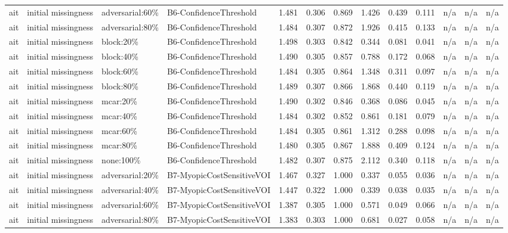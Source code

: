 \begin{table}[!ht]
{\begin{tabular}{lllllllllllll}
ait & initial missingness & adversarial:60\% & B6-ConfidenceThreshold & 1.481 & 0.306 & 0.869 & 1.426 & 0.439 & 0.111 & n/a & n/a & n/a \\
ait & initial missingness & adversarial:80\% & B6-ConfidenceThreshold & 1.484 & 0.307 & 0.872 & 1.926 & 0.415 & 0.133 & n/a & n/a & n/a \\
ait & initial missingness & block:20\% & B6-ConfidenceThreshold & 1.498 & 0.303 & 0.842 & 0.344 & 0.081 & 0.041 & n/a & n/a & n/a \\
ait & initial missingness & block:40\% & B6-ConfidenceThreshold & 1.490 & 0.305 & 0.857 & 0.788 & 0.172 & 0.068 & n/a & n/a & n/a \\
ait & initial missingness & block:60\% & B6-ConfidenceThreshold & 1.484 & 0.305 & 0.864 & 1.348 & 0.311 & 0.097 & n/a & n/a & n/a \\
ait & initial missingness & block:80\% & B6-ConfidenceThreshold & 1.489 & 0.307 & 0.866 & 1.868 & 0.440 & 0.119 & n/a & n/a & n/a \\
ait & initial missingness & mcar:20\% & B6-ConfidenceThreshold & 1.490 & 0.302 & 0.846 & 0.368 & 0.086 & 0.045 & n/a & n/a & n/a \\
ait & initial missingness & mcar:40\% & B6-ConfidenceThreshold & 1.484 & 0.302 & 0.852 & 0.861 & 0.181 & 0.079 & n/a & n/a & n/a \\
ait & initial missingness & mcar:60\% & B6-ConfidenceThreshold & 1.484 & 0.305 & 0.861 & 1.312 & 0.288 & 0.098 & n/a & n/a & n/a \\
ait & initial missingness & mcar:80\% & B6-ConfidenceThreshold & 1.480 & 0.305 & 0.867 & 1.888 & 0.409 & 0.124 & n/a & n/a & n/a \\
ait & initial missingness & none:100\% & B6-ConfidenceThreshold & 1.482 & 0.307 & 0.875 & 2.112 & 0.340 & 0.118 & n/a & n/a & n/a \\
ait & initial missingness & adversarial:20\% & B7-MyopicCostSensitiveVOI & 1.467 & 0.327 & 1.000 & 0.337 & 0.055 & 0.036 & n/a & n/a & n/a \\
ait & initial missingness & adversarial:40\% & B7-MyopicCostSensitiveVOI & 1.447 & 0.322 & 1.000 & 0.339 & 0.038 & 0.035 & n/a & n/a & n/a \\
ait & initial missingness & adversarial:60\% & B7-MyopicCostSensitiveVOI & 1.387 & 0.305 & 1.000 & 0.571 & 0.049 & 0.066 & n/a & n/a & n/a \\
ait & initial missingness & adversarial:80\% & B7-MyopicCostSensitiveVOI & 1.383 & 0.303 & 1.000 & 0.681 & 0.027 & 0.058 & n/a & n/a & n/a \\

\end{tabular}}
\end{table}
